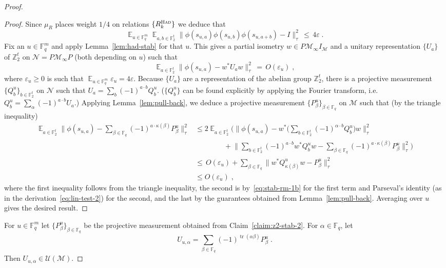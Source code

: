 \documentclass[11pt]{article}
\theoremstyle{definition}
\newcommand{\Id}{\ensuremath{I}}
\DeclareMathOperator*{\Expectation}{\mathbb{E}}
\newcommand{\Es}[1]{\Expectation_{#1}}
\newcommand{\F}{\ensuremath{\mathbb{F}}}
\newcommand{\Z}{\ensuremath{\mathbb{Z}}}
\newcommand{\mM}{\ensuremath{\mathcal{M}}}
\newcommand{\mU}{\ensuremath{\mathcal{U}}}
\newcommand{\had}{\textsc{Had}}
\newcommand{\eps}{\varepsilon}
\newcommand{\mN}{\mathcal{N}}
\DeclareMathOperator{\tr}{tr}
\begin{document}
\begin{proof}
\begin{proof}
Since $\mu_R$ places weight $1/4$ on relations $\{R^\had_k\}$ we deduce that 
\begin{equation}\label{eq:stab-rm-1}
\Es{u\in \F_q^m} \Es{a,b\in \F_2^t} \big\|\phi(s_{u,a})\phi(s_{u,b})\phi(s_{u,a+b})-\Id\big\|_\tau^2 \,\leq\, 4\eps\;. 
\end{equation}
Fix an $u\in \F_q^m$ and apply Lemma~\ref{lem:had-stab} for that $u$. This gives a partial isometry $w\in P\mM_\infty\Id_\mM$ and a unitary representation $\{U_a\}$ of $\Z_2^t$ on $\mN=P\mM_\infty P$ (both depending on $u$) such that 
\begin{equation}\label{eq:stab-rm-1b}
 \Es{a \in \F_2^t} \big\| \phi(s_{u,a}) - w^* U_a w \big\|_\tau^2 \,=\, O(\eps_u)\;,
\end{equation}
where $\eps_u\geq 0$ is such that $\Es{u\in \F_q^m} \eps_u = 4\eps$. Because $\{U_a\}$ are a representation of the abelian group $\Z_2^t$, there is a projective measurement $\{Q^u_b\}_{b\in \F_2^t}$ on $\mN$ such that $U_a = \sum_b (-1)^{a\cdot b} Q^u_b$. ($\{Q^u_b\}$ can be found explicitly by applying the Fourier transform, i.e.\ $Q^u_b = \sum_\alpha (-1)^{a \cdot b} U_a$.) Applying Lemma~\ref{lem:pull-back}, we deduce a projective measurement $\{P^u_\beta\}_{\beta\in \F_q}$ on $\mM$ such that (by the triangle inequality)
\begin{align*}
 \Es{a \in \F_2^t} \Big\| \phi(s_{u,a}) - \sum_{\beta\in\F_q} (-1)^{a \cdot \kappa(\beta)} P^u_\beta \Big\|_\tau^2
&\leq 2 \Es{a \in \F_2^t} \Big( \Big\| \phi(s_{u,a}) - w^*\Big(\sum_{b\in\F_2^t} (-1)^{\alpha \cdot b} Q^u_b \Big) w \Big\|_\tau^2 \\
&\qquad\qquad+   \Big\|  \sum_{b\in\F_2^t} (-1)^{a \cdot b} w^* Q^u_b w - \sum_{\beta\in\F_q} (-1)^{a \cdot \kappa(\beta)} P^u_\beta \Big\|_\tau^2\Big)\\
 &\leq\, O(\eps_u) +  \sum_{\beta\in\F_q} \Big\| w^* Q^u_{\kappa(\beta)} w - P^u_{\beta} \Big\|_\tau^2\\
&\leq O(\eps_u)\;,
\end{align*}
where the first inequality follows from the triangle inequality, the second is by~\eqref{eq:stab-rm-1b} for the first term and Parseval's identity (as in the derivation~\eqref{eq:lin-test-2}) for the second, and the last by the guarantees obtained from Lemma~\ref{lem:pull-back}. Averaging over $u$ gives the desired result.
\end{proof}

For $u\in \F_q^m$ let $\{P^{u}_\beta\}_{\beta \in \F_q}$ be the projective measurement obtained from Claim~\ref{claim:z2-stab-2}. For $\alpha\in \F_q$, let  
\[ U_{u,\alpha} = \sum_{\beta\in\F_q} (-1)^{\tr(\alpha\beta)} P^u_{\beta}\;.\]
Then $U_{u,\alpha} \in \mU(\mM)$. 


\end{proof}
\end{document}

